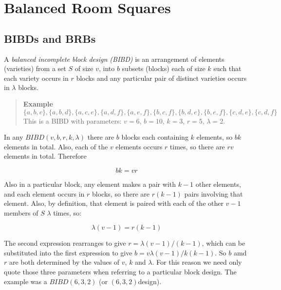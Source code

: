 \documentclass[
  11pt,
  a4paper]{book}
\newcounter{examplecounter}
\begin{document}
\hypertarget{balanced-room-squares}{%
\chapter{Balanced Room Squares}\label{balanced-room-squares}}

\hypertarget{bibds-and-brbs}{%
\section{BIBDs and BRBs}\label{bibds-and-brbs}}

A \emph{balanced incomplete block design (BIBD)} is an
arrangement of elements (varieties) from a set \(S\) of size
\(v\), into \(b\) subsets (blocks) each of size \(k\) such that
each variety occurs in \(r\) blocks and any particular pair of
distinct varieties occurs in \(\lambda\) blocks.

\begin{quote}  \textbf{Example } \quad 
$$\{a,b,c\},\{a,b,d\},\{a,c,e\},\{a,d,f\},\{a,e,f\},\{b,c,f\},\{b,d,e\},\{b,e,f\},\{c,d,e\},\{c,d,f\}$$
This is a BIBD with parameters: $v = 6$, $b = 10$, $k = 3$,
$r = 5$, $\lambda = 2$.
 \end{quote}

In any \(BIBD(v, b, r, k, \lambda)\) there are \(b\) blocks each
containing \(k\) elements, so \(bk\) elements in total. Also,
each of the \(v\) elements occurs \(r\) times, so there are \(rv\)
elements in total. Therefore

\begin{equation}
bk = vr
\end{equation}

Also in a
particular block, any element makes a pair with \(k - 1\)
other elements, and each element occurs in \(r\) blocks, so
there are \(r(k - 1)\) pairs involving that element. Also, by
definition, that element is paired with each of the other
\(v - 1\) members of \(S\) \(\lambda\) times, so:

\begin{equation}
\lambda (v - 1) = r(k - 1)
\end{equation}

The second expression rearranges to give
\(r = \lambda (v - 1)/(k - 1)\), which can be substituted
into the first expression to give
\(b = v\lambda (v - 1)/k(k - 1)\). So \(b\) amd \(r\) are
both determined by the values of \(v\), \(k\) and \(\lambda\). For
this reason we need only quote those three parameters when
referring to a particular block design. The example was a
\(BIBD(6, 3, 2)\) (or \((6, 3, 2)\)design).
\end{document}
